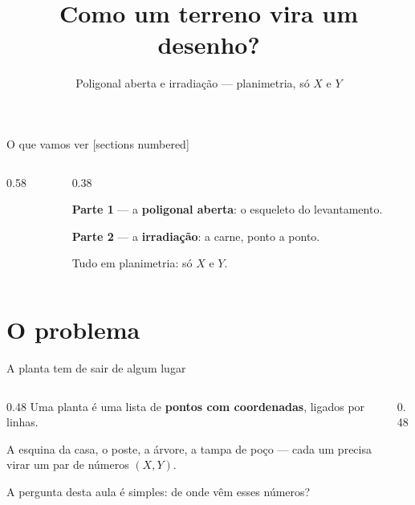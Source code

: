 \documentclass[aspectratio=169,11pt]{beamer}
\title{Como um terreno vira um desenho?}
\subtitle{Poligonal aberta e irradiação --- planimetria, só $X$ e $Y$}
\author{}
\institute{Surveyor Valley}
\date{}
\newcommand{\bnum}[1]{\textbf{\textcolor{mTeal}{#1}}}
\begin{document}
\maketitle

\begin{frame}{O que vamos ver}
  [sections numbered]
  \begin{columns}[T]
    \begin{column}{0.58\textwidth}
      \tableofcontents
    \end{column}
    \begin{column}{0.38\textwidth}
      \begin{ideia}[title={Duas partes}]
        \small
        \textbf{Parte 1} --- a \textcolor{corApoio}{\textbf{poligonal aberta}}: o esqueleto
        do levantamento.
        \medskip

        \textbf{Parte 2} --- a \textcolor{corDetalhe}{\textbf{irradiação}}: a carne, ponto a
        ponto.
        \medskip

        Tudo em planimetria: só $X$ e $Y$.
      \end{ideia}
    \end{column}
  \end{columns}
\end{frame}

\section{O problema}

\begin{frame}{A planta tem de sair de algum lugar}
  \begin{columns}[T]
    \begin{column}{0.48\textwidth}
      Uma planta é uma lista de \bnum{pontos com coordenadas}, ligados por linhas.
      \medskip

      A esquina da casa, o poste, a árvore, a tampa de poço --- cada um precisa virar um
      par de números $(X, Y)$.
      \medskip

      A pergunta desta aula é simples: \alert{de onde vêm esses números?}
    \end{column}
    \begin{column}{0.48\textwidth}
      \centering
    \end{column}
  \end{columns}
\end{frame}
\end{document}
